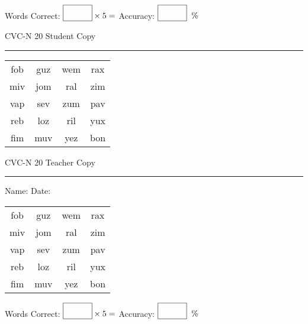 \documentclass{memoir}
\begin{document}
\small

Words Correct: $\fbox{\phantom{\huge 100}} \times 5 = $ Accuracy: $\fbox{\phantom{\huge 100}}\;\; \%$ 

\vfill

\newpage



\footnotesize \noindent
CVC-N 20 \hfill Student Copy
\smallskip
\hrule

\Large

\setlength{\tabcolsep}{14pt}
\def\arraystretch{2}

{\selectfont


\begin{vplace}[0.5]
\begin{center}
\begin{tabular}{cccc}
fob & guz & wem & rax \\
miv & jom & ral & zim \\
vap & sev & zum & pav \\
reb & loz & ril & yux \\
fim & muv & yez & bon \\
\end{tabular}
\end{center}
\end{vplace}

}

\newpage

\footnotesize \noindent
CVC-N 20 \hfill Teacher Copy
\smallskip
\hrule

\small

\vfill

\noindent
Name: \underline{\hspace{1.75in}} \hfill Date: \underline{\hspace{1in}}

\Large

{\selectfont


\begin{vplace}[0.5]
\begin{center}
\begin{tabular}{cccc}
fob & guz & wem & rax \\
miv & jom & ral & zim \\
vap & sev & zum & pav \\
reb & loz & ril & yux \\
fim & muv & yez & bon \\
\end{tabular}
\end{center}
\end{vplace}



}

\small

Words Correct: $\fbox{\phantom{\huge 100}} \times 5 = $ Accuracy: $\fbox{\phantom{\huge 100}}\;\; \%$ 

\vfill

\end{document}
